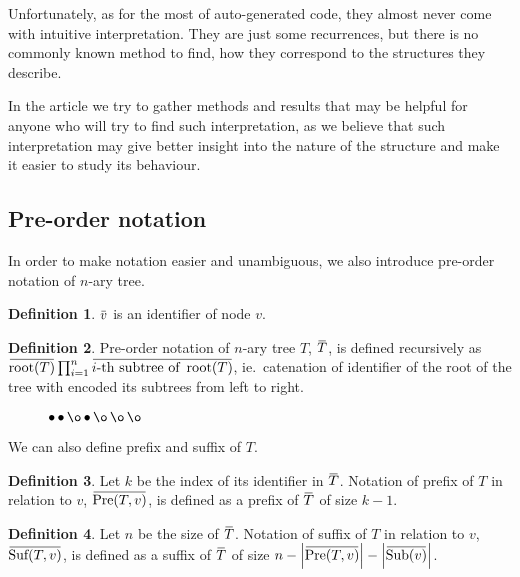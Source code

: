 \documentclass[final]{article}
\theoremstyle{definition}
\newtheorem{definition}{Definition}[subsection]
\theoremstyle{remark}
\newcommand{\ols}[1]{\mskip.5\thinmuskip\overline{\mskip-.5\thinmuskip {#1} \mskip-.5\thinmuskip}\mskip.5\thinmuskip} %
\newcommand{\enc}[1]{\ensuremath{\ols{#1}}}
\newcommand{\size}[1]{\ensuremath{\left|#1\right|}}
\DeclareMathOperator{\troot}{\text{root}}
\DeclareMathOperator{\tSub}{\text{Sub}}
\DeclareMathOperator{\tPre}{\text{Pre}}
\DeclareMathOperator{\tSuf}{\text{Suf}}
\DeclareMathOperator{\n}{\bullet}
\DeclareMathOperator{\no}{\o}
\begin{document}
Unfortunately, as for the most of auto-generated code, they almost never come with intuitive interpretation. They are just some recurrences, but there is no commonly known method to find, how they correspond to the structures they describe.

In the article we try to gather methods and results that may be helpful for anyone who will try to find such interpretation, as we believe that such interpretation may give better insight into the nature of the structure and make it easier to study its behaviour.

\subsection{Pre-order notation}%
\label{sub:pre_order_notation}



In order to make notation easier and unambiguous, we also introduce pre-order notation of \(n\)-ary tree.

\begin{definition}
    \(\enc{v}\) is an identifier of node \(v\). 
\end{definition}

\begin{definition}
    Pre-order notation of \(n\)-ary tree \(T\), \(\enc{T}\), is defined recursively as \(\enc{\troot(T)} \prod_{i=1}^{n} \enc{i\text{-th subtree of } \troot(T)}\), ie.\ catenation of identifier of the root of the tree with encoded its subtrees from left to right.
\end{definition}

\begin{figure}[h]
    \centering
    
    \caption{\(\n \n \no \n \no \no \no\)}
    \label{fig:oononnn}
\end{figure}

We can also define prefix and suffix of \(T\).

\begin{definition}
    Let \(k\) be the index of its identifier in \enc{T}. Notation of prefix of \(T\) in relation to \(v\), \(\enc{\tPre(T, v)}\), is defined as a prefix of \enc{T} of size \(k - 1\).
\end{definition}

\begin{definition}
    Let \(n\) be the size of \enc{T}. Notation of suffix of \(T\) in relation to \(v\), \(\enc{\tSuf(T, v)}\), is defined as a suffix of \enc{T} of size \(n - \size{\enc{\tPre(T, v)}} - \size{\enc{\tSub(v)}}\).
\end{definition}
\end{document}
